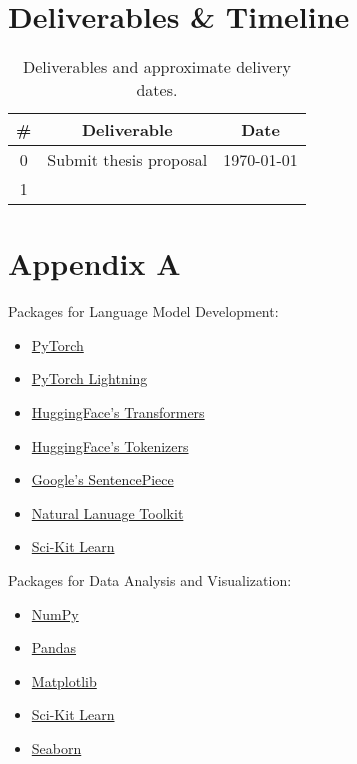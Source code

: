 \documentclass[10pt]{article}
\begin{document}
    \section{Deliverables \& Timeline}
        \begin{table}[h!]
            \centering
            \begin{tabular}{c|c|c}
                \# & Deliverable & Date \\
                \hline
                0 & Submit thesis proposal & \today \\
                1 &  & \\
            \end{tabular}
            \label{table:timeline}
            \caption{Deliverables and approximate delivery dates.}
        \end{table}

    \newpage
    \section{Appendix A}
        Packages for Language Model Development:
        \begin{multicols}{2}
            \begin{itemize}
                \item \href{https://pytorch.org}{PyTorch}
                \item \href{https://www.pytorchlightning.ai}{PyTorch Lightning}
                \item \href{https://github.com/huggingface/transformers}{HuggingFace's Transformers}
                \item \href{https://github.com/huggingface/tokenizers}{HuggingFace's Tokenizers}
                \item \href{https://github.com/google/sentencepiece}{Google's SentencePiece}
                \item \href{https://www.nltk.org}{Natural Lanuage Toolkit}
                \item \href{https://scikit-learn.org}{Sci-Kit Learn}
            \end{itemize}
        \end{multicols}

        Packages for Data Analysis and Visualization:
        \begin{itemize}
            \item \href{https://numpy.org}{NumPy}
            \item \href{https://pandas.pydata.org}{Pandas}
            \item \href{https://matplotlib.org}{Matplotlib}
            \item \href{https://scikit-learn.org}{Sci-Kit Learn}
            \item \href{https://seaborn.pydata.org}{Seaborn}
        \end{itemize}

    \newpage
    
    
\end{document}
